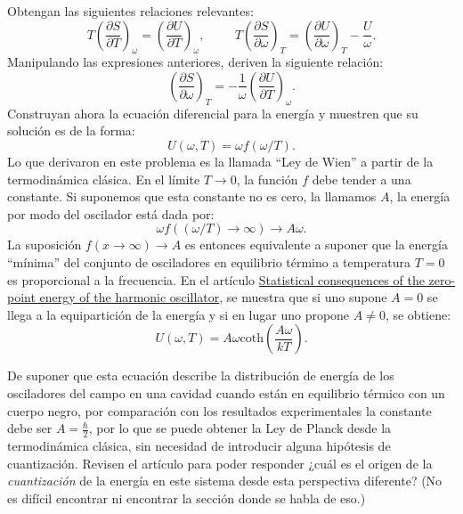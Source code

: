 \documentclass[10pt,letterpaper]{article}
\newenvironment{modenumerate}
  {\enumerate\setupmodenumerate}
  {\endenumerate}
\newif\ifmoditem
\newcommand{\setupmodenumerate}{%
  \global\moditemfalse
  \let\origmakelabel\makelabel
  \def\moditem##1{\global\moditemtrue\def\mesymbol{##1}\item}%
  \def\makelabel##1{%
    \origmakelabel{##1\ifmoditem\rlap{\mesymbol}\fi\enspace}%
    \global\moditemfalse}%
}
\begin{document}
\begin{modenumerate}
Obtengan las siguientes relaciones relevantes:
\begin{equation}
T\left( \frac{\partial S}{\partial T} \right)_\omega =\left(\frac{\partial U}{\partial T}\right)_\omega,\hspace{1cm}
T\left( \frac{\partial S}{\partial \omega} \right)_T=\left(\frac{\partial U}{\partial \omega}\right)_T-\frac{U}{\omega}.
\end{equation}
Manipulando las expresiones anteriores, deriven la siguiente relación:
\begin{equation}
\left( \frac{\partial S}{\partial \omega} \right)_T = -\frac{1}{\omega}\left(\frac{\partial U}{\partial T}\right)_\omega .
\end{equation}
Construyan ahora la ecuación diferencial para la energía y muestren que su solución es de la forma:
\begin{equation}
U(\omega ,T)=\omega f(\omega/T) .
\end{equation}
Lo que derivaron en este problema es la llamada ``Ley de Wien'' a partir de la termodinámica clásica. En el límite $T\to 0$, la función $f$ debe tender a una constante. Si suponemos que esta constante no es cero, la llamamos $A$, la energía por modo del oscilador está dada por:
\begin{equation}
\omega f((\omega /T) \to \infty) \to A\omega .
\end{equation}
La suposición $f(x\to\infty)\to A$ es entonces equivalente a suponer que la energía ``mínima'' del conjunto de osciladores en equilibrio término a temperatura $T=0$ es proporcional a la frecuencia. En el artículo \href{http://scitation.aip.org/content/aapt/journal/ajp/76/10/10.1119/1.2948780}{Statistical consequences of the zero-point energy of the harmonic oscillator}, se muestra que si uno supone $A=0$ se llega a la equipartición de la energía y si en lugar uno propone $A\neq 0$, se obtiene:
\begin{equation}
U(\omega ,T)=A\omega \text{coth}\left(\frac{A\omega}{kT}\right) .
\end{equation}

De suponer que esta ecuación describe la distribución de energía de los osciladores del campo en una cavidad cuando están en equilibrio térmico con un cuerpo negro, por comparación con los resultados experimentales la constante debe ser $A=\frac{\hbar}{2}$, por lo que se puede obtener la Ley de Planck desde la termodinámica clásica, sin necesidad de introducir alguna hipótesis de cuantización. Revisen el artículo para poder responder
¿cuál es el origen de la \emph{cuantización} de la energía en este sistema desde esta perspectiva diferente? (No es difícil encontrar ni encontrar la sección donde se habla de eso.)

\end{modenumerate}
\end{document}
